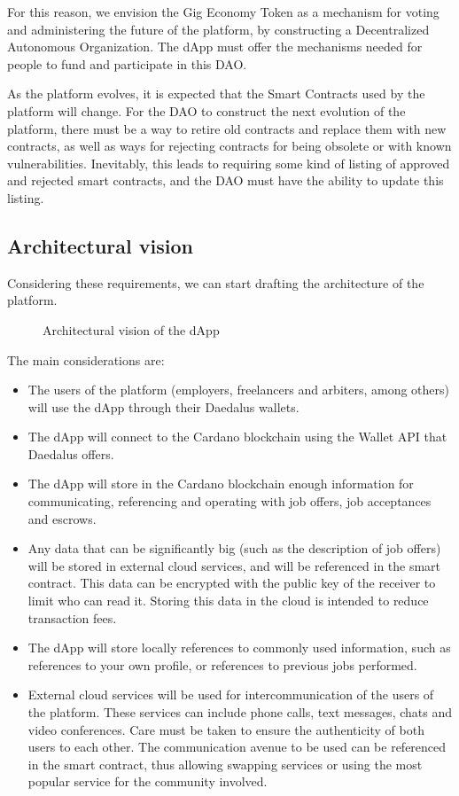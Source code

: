\documentclass{article}
\begin{document}
For this reason, we envision the Gig Economy Token as a mechanism for voting and administering the future of the platform, by constructing a Decentralized Autonomous Organization. The dApp must offer the mechanisms needed for people to fund and participate in this DAO.

As the platform evolves, it is expected that the Smart Contracts used by the platform will change. For the DAO to construct the next evolution of the platform, there must be a way to retire old contracts and replace them with new contracts, as well as ways for rejecting contracts for being obsolete or with known vulnerabilities. Inevitably, this leads to requiring some kind of listing of approved and rejected smart contracts, and the DAO must have the ability to update this listing.

\subsection{Architectural vision}

Considering these requirements, we can start drafting the architecture of the platform.

\begin{figure}[h]
  \centering{
    \large
    \resizebox{\textwidth}{!}{}
  }
  \caption{Architectural vision of the dApp} \label{fig:figureone}
\end{figure}

The main considerations are:
\begin{itemize}
  \item The users of the platform (employers, freelancers and arbiters, among others) will use the dApp through their Daedalus wallets.
  \item The dApp will connect to the Cardano blockchain using the Wallet API that Daedalus offers.
  \item The dApp will store in the Cardano blockchain enough information for communicating, referencing and operating with job offers, job acceptances and escrows.
  \item Any data that can be significantly big (such as the description of job offers) will be stored in external cloud services, and will be referenced in the smart contract. This data can be encrypted with the public key of the receiver to limit who can read it. Storing this data in the cloud is intended to reduce transaction fees.
  \item The dApp will store locally references to commonly used information, such as references to your own profile, or references to previous jobs performed.
  \item External cloud services will be used for intercommunication of the users of the platform. These services can include phone calls, text messages, chats and video conferences. Care must be taken to ensure the authenticity of both users to each other. The communication avenue to be used can be referenced in the smart contract, thus allowing swapping services or using the most popular service for the community involved.
\end{itemize}
\end{document}
